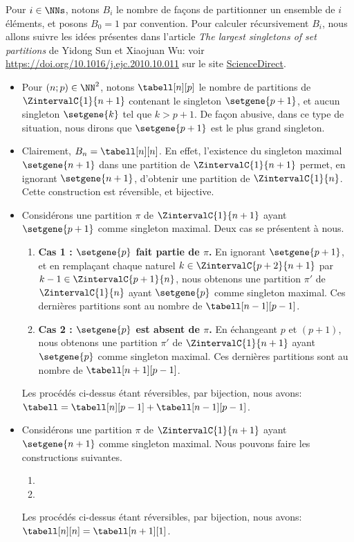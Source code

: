 Pour $i \in \NNs$, notons $B_i$ le nombre de façons de partitionner un ensemble de $i$ éléments, et posons $B_0 = 1$ par convention.
Pour calculer récursivement $B_i$, nous allons suivre les idées présentes dans l'article
\emph{\og The largest singletons of set partitions \fg}
de Yidong Sun et Xiaojuan Wu:
voir
\url{https://doi.org/10.1016/j.ejc.2010.10.011}
sur le site \href{https://www.sciencedirect.com/}{ScienceDirect}.
%
\begin{itemize}
    \item Pour $(n ; p) \in \NN^2$, notons $\tabell[n][p]$ le nombre de partitions de $\ZintervalC{1}{n+1}$ contenant le singleton $\setgene{p+1}$, et aucun singleton $\setgene{k}$ tel que $k > p+1$.
    De façon abusive, dans ce type de situation, nous dirons que $\setgene{p+1}$ est le plus grand singleton.


    \item Clairement, $B_n = \tabell[n][n]$.
    En effet,
    l'existence du singleton maximal $\setgene{n+1}$ dans une partition de $\ZintervalC{1}{n+1}$ permet, en ignorant $\setgene{n+1}$, d'obtenir une partition de $\ZintervalC{1}{n}$. Cette construction est réversible, et bijective.


    \item Considérons une partition $\pi$ de $\ZintervalC{1}{n+1}$ ayant $\setgene{p+1}$ comme singleton maximal.
    Deux cas se présentent à nous.
    \begin{enumerate}
        \item \textbf{\boldmath Cas 1 : $\setgene{p}$ fait partie de $\pi$.}
        En ignorant $\setgene{p+1}$, 
        et
        en remplaçant chaque naturel $k \in \ZintervalC{p+2}{n+1}$ par $k-1 \in \ZintervalC{p+1}{n}$,
        nous obtenons une partition $\pi'$ de $\ZintervalC{1}{n}$ ayant $\setgene{p}$ comme singleton maximal.
        Ces dernières partitions sont au nombre de $\tabell[n-1][p-1]$.


        \item \textbf{\boldmath Cas 2 : $\setgene{p}$ est absent de $\pi$.}
        En échangeant $p$ et $(p+1)$,
        nous obtenons une partition $\pi'$ de $\ZintervalC{1}{n+1}$ ayant $\setgene{p}$ comme singleton maximal. 
        Ces dernières partitions sont au nombre de $\tabell[n+1][p-1]$.
    \end{enumerate}
    Les procédés ci-dessus étant réversibles, par bijection, nous avons:
    $\tabell = \tabell[n][p-1] + \tabell[n-1][p-1]$.


    \item Considérons une partition $\pi$ de $\ZintervalC{1}{n+1}$ ayant $\setgene{n+1}$ comme singleton maximal. Nous pouvons faire les constructions suivantes.
    \begin{enumerate}
        \item 


        \item 
    \end{enumerate}
    Les procédés ci-dessus étant réversibles, par bijection, nous avons:
    $\tabell[n][n] = \tabell[n+1][1]$.
\end{itemize}


